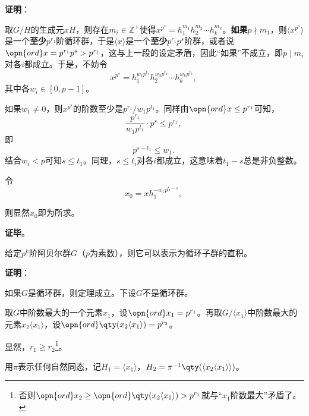 \textbf{证明}：

取$G/H$的生成元$xH$，则存在$m_i\in \mathbb{Z}^+$使得$x^{p^s}=h_1^{m_1}h_2^{m_2}\cdots h_k^{m_k}$。\textbf{如果}$p\nmid m_1$，则$\langle x^{p^s} \rangle$是一个\textbf{至少}$p^{r_1}$阶循环群，于是$\langle x \rangle$是一个\textbf{至少}$p^{r_1}p^s$阶群，或者说$\opn{ord}x=p^{r_1}p^s>p^{r_1}$，这与上一段的设定矛盾，因此“如果”不成立，即$p\mid m_i$对各$i$都成立。于是，不妨令
\begin{equation}
    x^{p^s}=h_1^{w_1p^{t_1}}h_2^{w_2p^{t_2}}\cdots h_k^{w_kp^{t_k}}, ~
\end{equation}
其中各$w_i\in[0, p-1]$。

如果$w_1\not=0$，则$x^{p^s}$的阶数至少是$p^{r_1}/w_1p^{t_1}$。同样由$\opn{ord}x\leq p^{r_1}$可知，
\begin{equation}
    \frac{p^{r_1}}{w_1p^{t_1}}\cdot p^s\leq p^{r_1}, ~
\end{equation}
即
\begin{equation}
    p^{s-t_1}\leq w_1. ~
\end{equation}
结合$w_i<p$可知$s\leq t_1$。同理，$s\leq t_i$对各$i$都成立，这意味着$t_1-s$总是非负整数。

令
\begin{equation}
    x_0 = x h_1^{-w_1p^{t_1-s}}, ~
\end{equation}

则显然$x_0$即为所求。


\textbf{证毕}。



\begin{theorem}{}

给定$p^k$阶阿贝尔群$G$（$p$为素数），则它可以表示为循环子群的直积。

\end{theorem}


\textbf{证明}：

如果$G$是循环群，则定理成立。下设$G$不是循环群。

取$G$中阶数最大的一个元素$x_1$，设$\opn{ord}x_1=p^{r_1}$。再取$G/\langle x_1 \rangle$中阶数最大的元素$x_2\langle x_1 \rangle$，设$\opn{ord}\qty(x_2\langle x_1 \rangle) = p^{r_2}$。

显然，$r_1\geq r_2$\footnote{否则$\opn{ord}x_2\geq \opn{ord}\qty(x_2\langle x_1 \rangle)>p^{r_1}$就与“$x_1$阶数最大”矛盾了。}。

用$\pi$表示任何自然同态，记$H_1=\langle x_1 \rangle$，$H_2=\pi^{-1}\qty(\langle x_2\langle x_1 \rangle \rangle)$。

